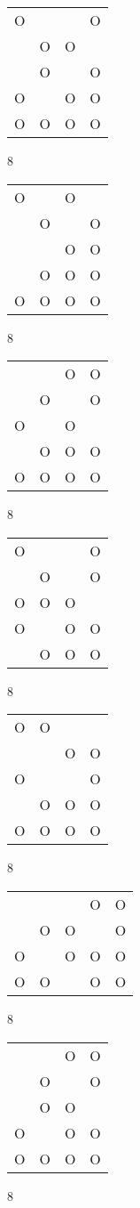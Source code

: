 \begin{tabular}{|m{0.2cm}m{0.2cm}m{0.2cm}m{0.2cm}|}\hline
O& & &O\\
 &O&O& \\
 &O& &O\\
O& &O&O\\
O&O&O&O\\
\hline\end{tabular}8
\begin{tabular}{|m{0.2cm}m{0.2cm}m{0.2cm}m{0.2cm}|}\hline
O& &O& \\
 &O& &O\\
 & &O&O\\
 &O&O&O\\
O&O&O&O\\
\hline\end{tabular}8
\begin{tabular}{|m{0.2cm}m{0.2cm}m{0.2cm}m{0.2cm}|}\hline
 & &O&O\\
 &O& &O\\
O& &O& \\
 &O&O&O\\
O&O&O&O\\
\hline\end{tabular}8
\begin{tabular}{|m{0.2cm}m{0.2cm}m{0.2cm}m{0.2cm}|}\hline
O& & &O\\
 &O& &O\\
O&O&O& \\
O& &O&O\\
 &O&O&O\\
\hline\end{tabular}8
\begin{tabular}{|m{0.2cm}m{0.2cm}m{0.2cm}m{0.2cm}|}\hline
O&O& & \\
 & &O&O\\
O& & &O\\
 &O&O&O\\
O&O&O&O\\
\hline\end{tabular}8
\begin{tabular}{|m{0.2cm}m{0.2cm}m{0.2cm}m{0.2cm}m{0.2cm}|}\hline
 & & &O&O\\
 &O&O& &O\\
O& &O&O&O\\
O&O& &O&O\\
\hline\end{tabular}8
\begin{tabular}{|m{0.2cm}m{0.2cm}m{0.2cm}m{0.2cm}|}\hline
 & &O&O\\
 &O& &O\\
 &O&O& \\
O& &O&O\\
O&O&O&O\\
\hline\end{tabular}8

